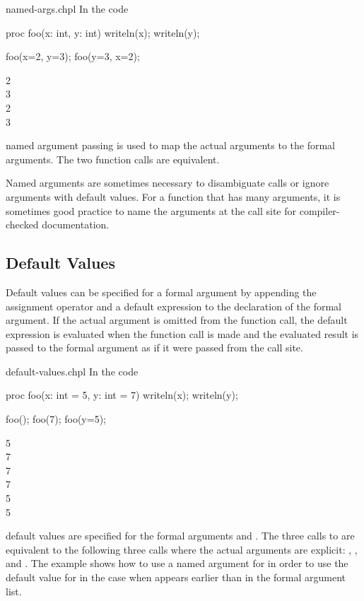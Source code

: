 \begin{chapelexample}{named-args.chpl}
In the code
\begin{chapel}
proc foo(x: int, y: int) { writeln(x); writeln(y); }

foo(x=2, y=3);
foo(y=3, x=2);
\end{chapel}
\begin{chapelprintoutput}
2\\
3\\
2\\
3\\
\end{chapelprintoutput}
named argument passing is used to map the actual arguments to the
formal arguments.  The two function calls are equivalent.
\end{chapelexample}

Named arguments are sometimes necessary to disambiguate calls or
ignore arguments with default values.  For a function that has many
arguments, it is sometimes good practice to name the arguments at the
call site for compiler-checked documentation.

\subsection{Default Values}
\label{Default_Values}

Default values can be specified for a formal argument by appending the
assignment operator and a default expression to the declaration of the
formal argument.  If the actual argument is omitted from the function
call, the default expression is evaluated when the function call is
made and the evaluated result is passed to the formal argument as if
it were passed from the call site.

\begin{chapelexample}{default-values.chpl}
In the code
\begin{chapel}
proc foo(x: int = 5, y: int = 7) { writeln(x); writeln(y); }

foo();
foo(7);
foo(y=5);
\end{chapel}
\begin{chapelprintoutput}
5\\
7\\
7\\
7\\
5\\
5\\
\end{chapelprintoutput}
default values are specified for the formal arguments 
and .  The three calls to  are equivalent to the
following three calls where the actual arguments are
explicit: , , and .
The example  shows how to use a named argument
for  in order to use the default value for  in the
case when  appears earlier than  in the formal
argument list.
\end{chapelexample}


